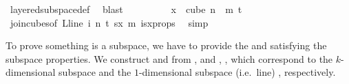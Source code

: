 \begin{isabellebody}
\ layered{\isacharunderscore}{\kern0pt}subspace{\isacharunderscore}{\kern0pt}def\ \isamarkupfalse%
\ blast\isanewline
\ \ \ \ \ \ \isamarkupfalse%
\ \isamarkupfalse%
\ {\isachardoublequoteopen}x\ {\isasymin}\ cube\ {\isacharparenleft}{\kern0pt}n\ {\isacharplus}{\kern0pt}\ m{\isacharparenright}{\kern0pt}\ {\isacharparenleft}{\kern0pt}t{\isacharplus}{\kern0pt}{}{\isacharparenright}{\kern0pt}{\isachardoublequoteclose}\ \isamarkupfalse%
\ join{\isacharunderscore}{\kern0pt}cubes{\isacharbrackleft}{\kern0pt}of\ {\isachardoublequoteopen}L{\isacharunderscore}{\kern0pt}line\ i{\isachardoublequoteclose}\ {\isachardoublequoteopen}n{\isachardoublequoteclose}\ {\isachardoublequoteopen}t{\isachardoublequoteclose}\ sx\ m{\isacharbrackright}{\kern0pt}\ isx{\isacharunderscore}{\kern0pt}props\ \isamarkupfalse%
\ simp\ \isanewline
\ \ \ \ \isamarkupfalse%
%
\endisatagproof
{\isafoldproof}%
%
\isadelimproof
%
\endisadelimproof
%
\isadelimdocument
%
\endisadelimdocument
%
\isatagdocument
%
\isamarkuptrue%
%
\begin{isamarkuptext}%
To prove something is a subspace, we have to provide the  and  satisfying the subspace properties. We construct  and  from ,  and , , which correspond to the $k$-dimensional subspace  and the $1$-dimensional subspace (i.e.\ line) , respectively.%
\end{isamarkuptext}\isamarkuptrue%
%
\endisatagdocument
{\isafolddocument}%
%
\isadelimdocument
%
\endisadelimdocument
%
\isadelimproof
\ \ \ \ %
\endisadelimproof
%
\isatagproof
{}\isamarkupfalse%

\end{isabellebody}
